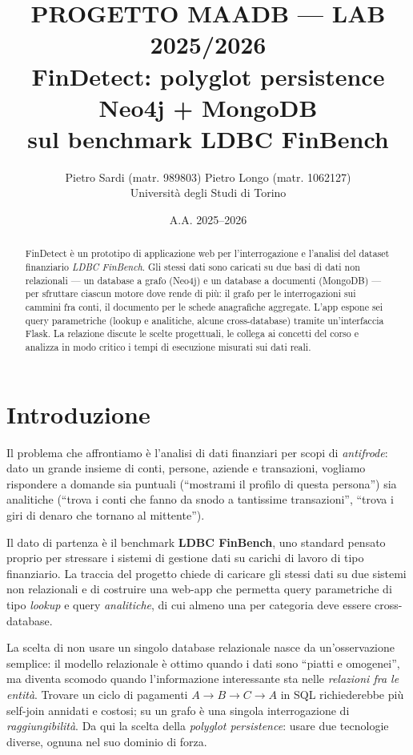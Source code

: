 \documentclass[11pt,a4paper]{article}
\title{\vspace{-1.5cm}\textbf{PROGETTO MAADB --- LAB 2025/2026}\\[0.3cm]
\large FinDetect: polyglot persistence Neo4j + MongoDB\\ sul benchmark LDBC FinBench}
\author{Pietro Sardi (matr. 989803) \quad Pietro Longo (matr. 1062127)\\[0.2cm]
\normalsize Universit\`a degli Studi di Torino}
\date{A.A. 2025--2026}
\begin{document}
\maketitle
\thispagestyle{empty}

\begin{abstract}
\noindent FinDetect \`e un prototipo di applicazione web per l'interrogazione e
l'analisi del dataset finanziario \emph{LDBC FinBench}. Gli stessi dati sono
caricati su due basi di dati non relazionali --- un database a grafo (Neo4j) e
un database a documenti (MongoDB) --- per sfruttare ciascun motore dove rende di
pi\`u: il grafo per le interrogazioni sui cammini fra conti, il documento per le
schede anagrafiche aggregate. L'app espone sei query parametriche (lookup e
analitiche, alcune cross-database) tramite un'interfaccia Flask. La relazione
discute le scelte progettuali, le collega ai concetti del corso e analizza in
modo critico i tempi di esecuzione misurati sui dati reali.
\end{abstract}

\newpage
\tableofcontents
\newpage

\section{Introduzione}

Il problema che affrontiamo \`e l'analisi di dati finanziari per scopi di
\emph{antifrode}: dato un grande insieme di conti, persone, aziende e
transazioni, vogliamo rispondere a domande sia puntuali (``mostrami il profilo
di questa persona'') sia analitiche (``trova i conti che fanno da snodo a
tantissime transazioni'', ``trova i giri di denaro che tornano al mittente'').

Il dato di partenza \`e il benchmark \textbf{LDBC FinBench}, uno standard pensato
proprio per stressare i sistemi di gestione dati su carichi di lavoro di tipo
finanziario. La traccia del progetto chiede di caricare gli stessi dati su due
sistemi non relazionali e di costruire una web-app che permetta query
parametriche di tipo \emph{lookup} e query \emph{analitiche}, di cui almeno una
per categoria deve essere cross-database.

La scelta di non usare un singolo database relazionale nasce da
un'osservazione semplice: il modello relazionale \`e ottimo quando i dati sono
``piatti e omogenei'', ma diventa scomodo quando l'informazione interessante
sta nelle \emph{relazioni fra le entit\`a}. Trovare un ciclo di
pagamenti $A\to B\to C\to A$ in SQL richiederebbe pi\`u self-join annidati e
costosi; su un grafo \`e una singola interrogazione di
\emph{raggiungibilit\`a}. Da qui la scelta della \emph{polyglot persistence}:
usare due tecnologie diverse, ognuna nel suo dominio di forza.
\end{document}
